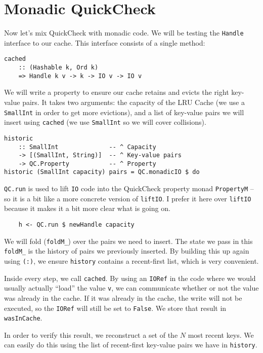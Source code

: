 \section{Monadic QuickCheck}


Now let's mix QuickCheck with monadic code. We will be testing the \texttt{Handle} interface to our cache. This interface consists of a single method:

\begin{verbatim}
cached
    :: (Hashable k, Ord k)
    => Handle k v -> k -> IO v -> IO v
\end{verbatim}
We will write a property to ensure our cache retains and evicts the right key-value pairs. It takes two arguments: the capacity of the LRU Cache (we use a \texttt{SmallInt} in order to get more evictions), and a list of key-value pairs we will insert using \texttt{cached} (we use \texttt{SmallInt} so we will cover collisions).

\begin{verbatim}
historic
    :: SmallInt              -- ^ Capacity
    -> [(SmallInt, String)]  -- ^ Key-value pairs
    -> QC.Property           -- ^ Property
historic (SmallInt capacity) pairs = QC.monadicIO $ do
\end{verbatim}
\texttt{QC.run} is used to lift \texttt{IO} code into the QuickCheck property monad \texttt{PropertyM} -- so it is a bit like a more concrete version of \texttt{liftIO}. I prefer it here over \texttt{liftIO} because it makes it a bit more clear what is going on.

\begin{verbatim}
    h <- QC.run $ newHandle capacity
\end{verbatim}
We will fold (\texttt{foldM\_}) over the pairs we need to insert. The state we pass in this \texttt{foldM\_} is the history of pairs we previously inserted. By building this up again using \texttt{(:)}, we ensure \texttt{history} contains a recent-first list, which is very convenient.

Inside every step, we call \texttt{cached}. By using an \texttt{IORef} in the code where we would usually actually ``load'' the value \texttt{v}, we can communicate whether or not the value was already in the cache. If it was already in the cache, the write will not be executed, so the \texttt{IORef} will still be set to \texttt{False}. We store that result in \texttt{wasInCache}.

In order to verify this result, we reconstruct a set of the $N$ most recent keys. We can easily do this using the list of recent-first key-value pairs we have in \texttt{history}.

